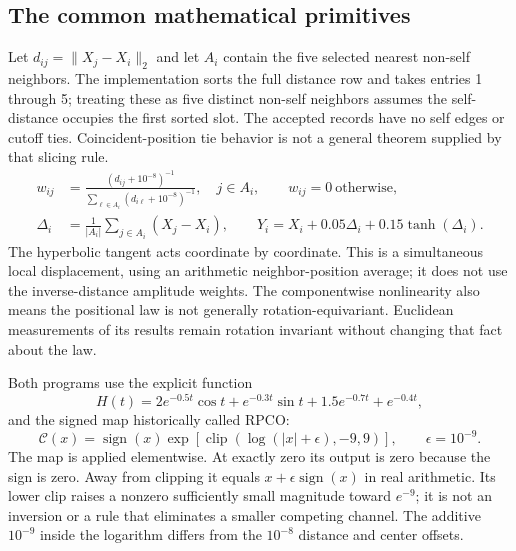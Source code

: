 \documentclass[11pt,a4paper]{article}
\newcommand{\C}{\mathcal{C}}
\begin{document}
\subsection{The common mathematical primitives}
\label{sec:primitives}
Let $d_{ij}=\|X_j-X_i\|_2$ and let $A_i$ contain the five selected nearest non-self neighbors. The implementation sorts the full distance row and takes entries 1 through 5; treating these as five distinct non-self neighbors assumes the self-distance occupies the first sorted slot. The accepted records have no self edges or cutoff ties. Coincident-position tie behavior is not a general theorem supplied by that slicing rule.
\begin{align}
 w_{ij}&=\frac{(d_{ij}+10^{-8})^{-1}}{\sum_{\ell\in A_i}(d_{i\ell}+10^{-8})^{-1}},\quad j\in A_i,\qquad w_{ij}=0\ \text{otherwise},\label{eq:weights}\\
 \Delta_i&=\frac{1}{|A_i|}\sum_{j\in A_i}(X_j-X_i),\qquad
 Y_i=X_i+0.05\Delta_i+0.15\tanh(\Delta_i).\label{eq:localX}
\end{align}
The hyperbolic tangent acts coordinate by coordinate. This is a simultaneous local displacement, using an arithmetic neighbor-position average; it does not use the inverse-distance amplitude weights. The componentwise nonlinearity also means the positional law is not generally rotation-equivariant. Euclidean measurements of its results remain rotation invariant without changing that fact about the law.

Both programs use the explicit function
\begin{equation}
H(t)=2e^{-0.5t}\cos t+e^{-0.3t}\sin t+1.5e^{-0.7t}+e^{-0.4t},\label{eq:H}
\end{equation}
and the signed map historically called RPCO:
\begin{equation}
\C(x)=\operatorname{sign}(x)\exp\!\left[\operatorname{clip}\!\left(\log(|x|+\epsilon),-9,9\right)\right],\qquad \epsilon=10^{-9}.\label{eq:compress}
\end{equation}
The map is applied elementwise. At exactly zero its output is zero because the sign is zero. Away from clipping it equals $x+\epsilon\operatorname{sign}(x)$ in real arithmetic. Its lower clip raises a nonzero sufficiently small magnitude toward $e^{-9}$; it is not an inversion or a rule that eliminates a smaller competing channel. The additive $10^{-9}$ inside the logarithm differs from the $10^{-8}$ distance and center offsets.
\end{document}
